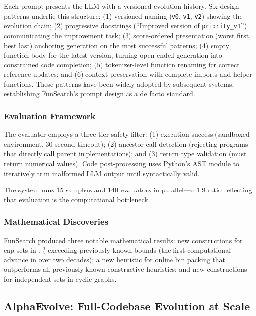 Each prompt presents the LLM with a versioned evolution history. Six design patterns underlie this structure: (1) versioned naming (\texttt{v0}, \texttt{v1}, \texttt{v2}) showing the evolution chain; (2) progressive docstrings (``Improved version of \texttt{priority\_v1}'') communicating the improvement task; (3) score-ordered presentation (worst first, best last) anchoring generation on the most successful patterns; (4) empty function body for the latest version, turning open-ended generation into constrained code completion; (5) tokenizer-level function renaming for correct reference updates; and (6) context preservation with complete imports and helper functions. These patterns have been widely adopted by subsequent systems, establishing FunSearch's prompt design as a de facto standard.

\subsubsection{Evaluation Framework}

The evaluator employs a three-tier safety filter: (1) execution success (sandboxed environment, 30-second timeout); (2) ancestor call detection (rejecting programs that directly call parent implementations); and (3) return type validation (must return numerical values). Code post-processing uses Python's AST module to iteratively trim malformed LLM output until syntactically valid.

The system runs 15 samplers and 140 evaluators in parallel---a 1:9 ratio reflecting that evaluation is the computational bottleneck.

\subsubsection{Mathematical Discoveries}

FunSearch produced three notable mathematical results: new constructions for cap sets in $\mathbb{F}_3^n$ exceeding previously known bounds (the first computational advance in over two decades); a new heuristic for online bin packing that outperforms all previously known constructive heuristics; and new constructions for independent sets in cyclic graphs.

\subsection{AlphaEvolve: Full-Codebase Evolution at Scale}
\label{sec:alphaevolve}

